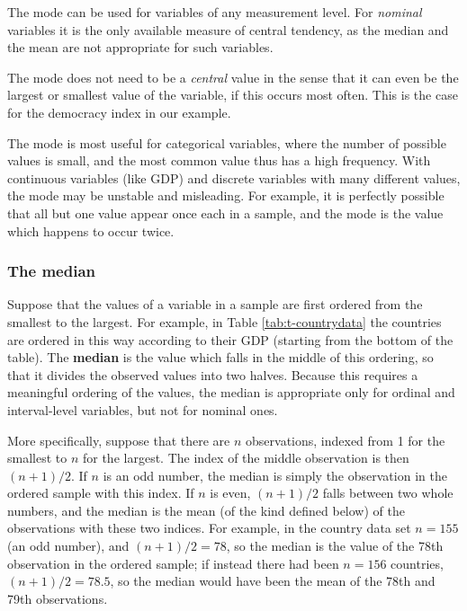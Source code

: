 \documentclass[11pt,a4paper,openany]{book}
\begin{document}
The mode can be used for variables of any measurement level. For
\emph{nominal} variables it is the only available measure of central
tendency, as the median and the mean are not appropriate for such
variables.

The mode does not need to be a \emph{central} value in the sense that it
can even be the largest or smallest value of the variable, if this
occurs most often. This is the case for the democracy index in our
example.

The mode is most useful for categorical variables, where the number of
possible values is small, and the most common value thus has a high
frequency. With continuous variables (like GDP) and discrete variables
with many different values, the mode may be unstable and misleading. For
example, it is perfectly possible that all but one value appear once
each in a sample, and the mode is the value which happens to occur
twice.

\subsubsection*{The median}\label{the-median}

Suppose that the values of a variable in a sample are first ordered from
the smallest to the largest. For example, in Table
\ref{tab:t-countrydata} the countries are ordered in this way according
to their GDP (starting from the bottom of the table). The
\textbf{median} is the value which falls in the middle of this ordering,
so that it divides the observed values into two halves. Because this
requires a meaningful ordering of the values, the median is appropriate
only for ordinal and interval-level variables, but not for nominal ones.

More specifically, suppose that there are \(n\) observations, indexed
from 1 for the smallest to \(n\) for the largest. The index of the
middle observation is then \((n+1)/2\). If \(n\) is an odd number, the
median is simply the observation in the ordered sample with this index.
If \(n\) is even, \((n+1)/2\) falls between two whole numbers, and the
median is the mean (of the kind defined below) of the observations with
these two indices. For example, in the country data set \(n=155\) (an
odd number), and \((n+1)/2=78\), so the median is the value of the 78th
observation in the ordered sample; if instead there had been \(n=156\)
countries, \((n+1)/2=78.5\), so the median would have been the mean of
the 78th and 79th observations.
\end{document}
